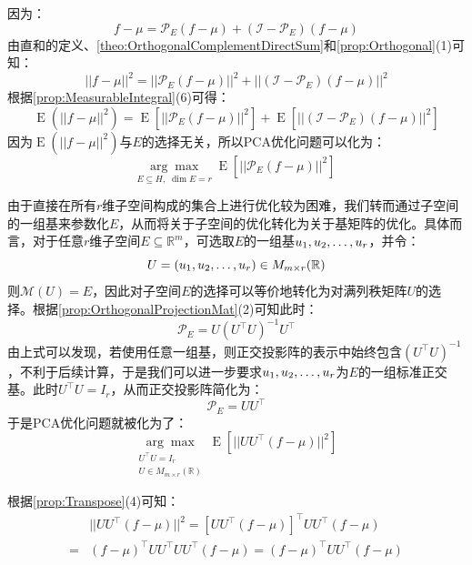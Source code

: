 因为：
\begin{equation*}
	f-\mu=\mathcal{P}_E(f-\mu)+(\mathcal{I}-\mathcal{P}_E)(f-\mu)
\end{equation*}
由直和的定义、\cref{theo:OrthogonalComplementDirectSum}和\cref{prop:Orthogonal}(1)可知：
\begin{equation*}
	||f-\mu||^2=||\mathcal{P}_E(f-\mu)||^2+||(\mathcal{I}-\mathcal{P}_E)(f-\mu)||^2
\end{equation*}
根据\cref{prop:MeasurableIntegral}(6)可得：
\begin{equation*}
	\operatorname{E}(||f-\mu||^2)=\operatorname{E}[||\mathcal{P}_E(f-\mu)||^2]+\operatorname{E}[||(\mathcal{I}-\mathcal{P}_E)(f-\mu)||^2]
\end{equation*}
因为$\operatorname{E}(||f-\mu||^2)$与$E$的选择无关，所以PCA优化问题可以化为：
\begin{equation*}
	\underset{E\subseteq H,\;\dim E=r}{\arg\max}\;\operatorname{E}[||\mathcal{P}_E(f-\mu)||^2]
\end{equation*}\par
由于直接在所有$r$维子空间构成的集合上进行优化较为困难，我们转而通过子空间的一组基来参数化$E$，从而将关于子空间的优化转化为关于基矩阵的优化。具体而言，对于任意$r$维子空间$E\subseteq\mathbb{R}^m$，可选取$E$的一组基$u_1, u_2, \dots, u_{r}$，并令：
\begin{equation*}
	U=(u_1, u_2, \dots, u_{r})\in M_{m\times r}(\mathbb{R})
\end{equation*}
则$\mathcal{M}(U)=E$，因此对子空间$E$的选择可以等价地转化为对满列秩矩阵$U$的选择。根据\cref{prop:OrthogonalProjectionMat}(2)可知此时：
\begin{equation*}
	\mathcal{P}_E=U(U^{\top}U)^{-1}U^{\top}
\end{equation*}
由上式可以发现，若使用任意一组基，则正交投影阵的表示中始终包含$(U^{\top}U)^{-1}$，不利于后续计算，于是我们可以进一步要求$u_1, u_2, \dots, u_{r}$为$E$的一组标准正交基。此时$U^{\top}U=I_r$，从而正交投影阵简化为：
\begin{equation*}
	\mathcal{P}_E=UU^{\top}
\end{equation*}
于是PCA优化问题就被化为了：
\begin{equation*}
	\underset{\substack{U^{\top}U=I_r\\U\in M_{m\times r}(\mathbb{R})}}{\arg\max}\;\operatorname{E}[||UU^{\top}(f-\mu)||^2]
\end{equation*}\par
根据\cref{prop:Transpose}(4)可知：
\begin{align*}
	&||UU^{\top}(f-\mu)||^2=[UU^{\top}(f-\mu)]^{\top}UU^{\top}(f-\mu) \\
	=&(f-\mu)^{\top}UU^{\top}UU^{\top}(f-\mu)=(f-\mu)^{\top}UU^{\top}(f-\mu)
\end{align*}

